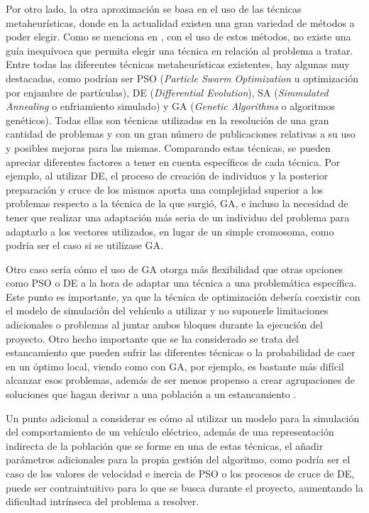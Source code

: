 \documentclass[11pt,spanish,listoffigures,listoftables]{tfgetsinf}
\begin{document}
Por otro lado, la otra aproximación se basa en el uso de las técnicas metaheurísticas, donde en la actualidad existen una gran variedad de métodos a poder elegir. Como se menciona en \cite{DOKEROGLU2019106040}, con el uso de estos métodos, no existe una guía inequívoca que permita elegir una técnica en relación al problema a tratar. Entre todas las diferentes técnicas metaheurísticas existentes, hay algunas muy destacadas, como podrían ser PSO (\textit{Particle Swarm Optimization} u optimización por enjambre de partículas), DE (\textit{Differential Evolution}), SA (\textit{Simmulated Annealing} o enfriamiento simulado) y GA (\textit{Genetic Algorithms} o algoritmos genéticos). Todas ellas son técnicas utilizadas en la resolución de una gran cantidad de problemas y con un gran número de publicaciones relativas a su uso y posibles mejoras para las mismas. Comparando estas técnicas, se pueden apreciar diferentes factores a tener en cuenta específicos de cada técnica. Por ejemplo, al utilizar DE, el proceso de creación de individuos y la posterior preparación y cruce de los mismos aporta una complejidad superior a los problemas respecto a la técnica de la que surgió, GA, e incluso la necesidad de tener que realizar una adaptación más seria de un individuo del problema para adaptarlo a los vectores utilizados, en lugar de un simple cromosoma, como podría ser el caso si se utilizase GA\cite{KACHI2012}.

Otro caso sería cómo el uso de GA otorga más flexibilidad que otras opciones como PSO o DE a la hora de adaptar una técnica a una problemática específica. Este punto es importante, ya que la técnica de optimización debería coexistir con el modelo de simulación del vehículo a utilizar y no suponerle limitaciones adicionales o problemas al juntar ambos bloques durante la ejecución del proyecto. Otro hecho importante que se ha considerado se trata del estancamiento que pueden sufrir las diferentes técnicas o la probabilidad de caer en un óptimo local, viendo como con GA, por ejemplo, es bastante más difícil alcanzar esos problemas, además de ser menos propenso a crear agrupaciones de soluciones que hagan derivar a una población a un estancamiento \cite{GANDOMI20131}.

Un punto adicional a considerar es cómo al utilizar un modelo para la simulación del comportamiento de un vehículo eléctrico, además de una representación indirecta de la población que se forme en una de estas técnicas, el añadir parámetros adicionales para la propia gestión del algoritmo, como podría ser el caso de los valores de velocidad e inercia de PSO o los procesos de cruce de DE, puede ser contraintuitivo para lo que se busca durante el proyecto, aumentando la dificultad intrínseca del problema a resolver.
\end{document}
